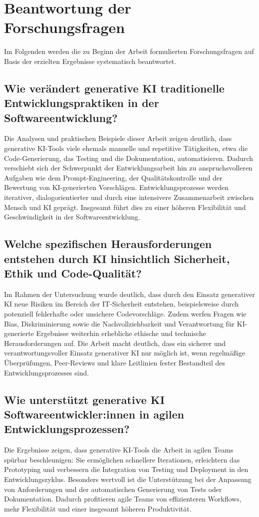 \section{Beantwortung der Forschungsfragen}

Im Folgenden werden die zu Beginn der Arbeit formulierten Forschungsfragen auf
Basis der erzielten Ergebnisse systematisch beantwortet.

\subsection*{Wie verändert generative KI traditionelle Entwicklungspraktiken in der Softwareentwicklung?}
Die Analysen und praktischen Beispiele dieser Arbeit zeigen deutlich, dass
generative KI-Tools viele ehemals manuelle und repetitive Tätigkeiten, etwa die
Code-Generierung, das Testing und die Dokumentation, automatisieren. Dadurch
verschiebt sich der Schwerpunkt der Entwicklungsarbeit hin zu anspruchsvolleren
Aufgaben wie dem Prompt-Engineering, der Qualitätskontrolle und der Bewertung
von KI-generierten Vorschlägen. Entwicklungsprozesse werden iterativer,
dialogorientierter und durch eine intensivere Zusammenarbeit zwischen Mensch
und KI geprägt. Insgesamt führt dies zu einer höheren Flexibilität und
Geschwindigkeit in der Softwareentwicklung.

\subsection*{Welche spezifischen Herausforderungen entstehen durch KI hinsichtlich Sicherheit, Ethik und Code-Qualität?}
Im Rahmen der Untersuchung wurde deutlich, dass durch den Einsatz generativer
KI neue Risiken im Bereich der IT-Sicherheit entstehen, beispielsweise durch
potenziell fehlerhafte oder unsichere Codevorschläge. Zudem werfen Fragen wie
Bias, Diskriminierung sowie die Nachvollziehbarkeit und Verantwortung für
KI-generierte Ergebnisse weiterhin erhebliche ethische und technische
Herausforderungen auf. Die Arbeit macht deutlich, dass ein sicherer und
verantwortungsvoller Einsatz generativer KI nur möglich ist, wenn regelmäßige
Überprüfungen, Peer-Reviews und klare Leitlinien fester Bestandteil des
Entwicklungsprozesses sind.

\subsection*{Wie unterstützt generative KI Softwareentwickler:innen in agilen Entwicklungsprozessen?}
Die Ergebnisse zeigen, dass generative KI-Tools die Arbeit in agilen Teams
spürbar beschleunigen: Sie ermöglichen schnellere Iterationen, erleichtern das
Prototyping und verbessern die Integration von Testing und Deployment in den
Entwicklungszyklus. Besonders wertvoll ist die Unterstützung bei der Anpassung
von Anforderungen und der automatischen Generierung von Tests oder
Dokumentation. Dadurch profitieren agile Teams von effizienteren Workflows,
mehr Flexibilität und einer insgesamt höheren Produktivität.


